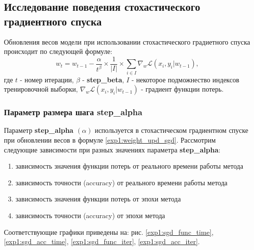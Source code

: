 \documentclass[a4paper, 11pt]{article}
\begin{document}
            
       \subsection{Исследование поведения стохастического градиентного спуска}
            Обновления весов модели при использовании стохастического градиетного спуска происходит по следующей формуле:
            \begin{equation}\label{exp1:weight_upd_sgd}
            w_t = w_{t-1} - \frac{\alpha}{t^\beta} \times \frac{1}{|I|} \times \sum_{i \in I}\nabla_{w}\mathcal{L}(x_i, y_i|w_{t-1}),
            \end{equation}
            где $t$ - номер итерации, $\beta$ - \textbf{step\_beta}, $I$ - некоторое подможнество индексов тренировочной выборки,  $\nabla_{w}\mathcal{L}(x_i, y_i|w_{t-1})$ - градиент функции потерь.
            \subsubsection{Параметр размера шага \textbf{step\_alpha}}
            Параметр \textbf{step\_alpha $(\alpha)$} используется в стохастическом градиентном спуске при обновлении весов в формуле \ref{exp1:weight_upd_sgd}.
            Рассмотрим следующие зависимости при разных значениях параметра \textbf{step\_alpha}:
            \begin{enumerate}\label{exp:dependencies_sgd}
                \item зависимость значения функции потерь от реального времени работы метода
                \item зависимость точности (accuracy) от реального времени работы метода
                \item зависимость значения функции потерь от эпохи метода
                \item зависимость точности (accuracy) от эпохи метода
            \end{enumerate}
            Соответствующие графики приведены на: рис. \ref{exp1:sgd_func_time}, \ref{exp1:sgd_acc_time}, \ref{exp1:sgd_func_iter}, \ref{exp1:sgd_acc_iter}.
            
\end{document}
